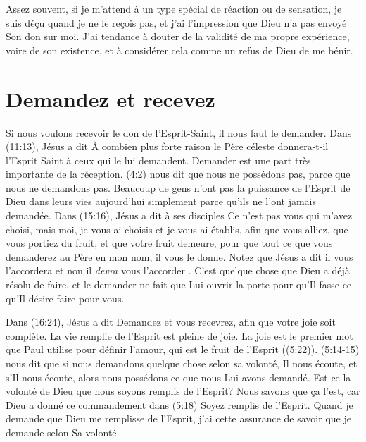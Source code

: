 Assez souvent, si je m'attend à un type spécial de réaction ou de sensation,
 je suis déçu quand je ne le reçois pas, et j'ai l'impression que Dieu
 n'a pas envoyé Son don sur moi. J'ai tendance à douter de la validité
 de ma propre expérience, 
 voire de son existence, et à considérer cela
 comme un refus de Dieu de me bénir.


\section{Demandez et recevez}

Si nous voulons recevoir le don de l'Esprit-Saint,
 il nous faut le demander. Dans (11:13), Jésus a dit\frcolon{}
 \Og À combien plus forte raison le Père céleste donnera-t-il
 l'Esprit Saint à ceux qui le lui demandent. \Fg{}
 Demander est une part très importante de la réception.
 (4:2) nous dit que nous ne possédons pas,
 parce que nous ne demandons pas. Beaucoup de gens n'ont pas
 la puissance de l'Esprit de Dieu dans leurs vies aujourd'hui
 simplement parce qu'ils ne l'ont jamais demandée.
 Dans (15:16), Jésus a dit à ses disciples\frcolon{}
 \Og Ce n'est pas vous qui m'avez choisi, mais moi,
 je vous ai choisis et je vous ai établis, afin que vous alliez,
 que vous portiez du fruit, et que votre fruit demeure,
 pour que tout ce que vous demanderez au Père en mon nom,
 il vous le donne. \Fg{}
 Notez que Jésus a dit\frcolon{} \Og il vous l'accordera \Fg{} et non
 \Og il \emph{devra} vous l'accorder \Fg{}.
 C'est quelque chose que Dieu a déjà résolu de faire,
 et le demander ne fait que Lui ouvrir la porte pour qu'Il fasse
 ce qu'Il désire faire pour vous.

Dans (16:24), Jésus a dit\frcolon{}
 \Og Demandez et vous recevrez, afin que votre joie soit complète. \Fg{}
 La vie remplie de l'Esprit est pleine de joie.
 La joie est le premier mot que Paul utilise pour définir l'amour,
 qui est le fruit de l'Esprit ((5:22)).
 (5:14-15) nous dit que si nous demandons quelque chose
 selon sa volonté, Il nous écoute, et s'Il nous écoute,
 alors nous possédons ce que nous Lui avons demandé.
 Est-ce la volonté de Dieu que nous soyons remplis de l'Esprit?
 Nous savons que ça l'est, car Dieu a donné ce commandement dans
 (5:18)\frcolon{} \Og Soyez remplis de l'Esprit. \Fg{}
 Quand je demande que Dieu me remplisse de l'Esprit,
 j'ai cette assurance de savoir que je demande selon Sa volonté.
 \nowidow[8]

